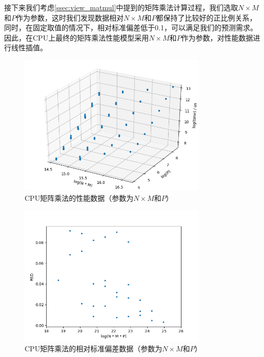     接下来我们考虑\ref{ssec:view_matmul}中提到的矩阵乘法计算过程，我们选取$ N \times M $和$ P $作为参数，这时我们发现数据相对$ N \times M $和$ P $都保持了比较好的正比例关系，同时，在固定取值的情况下，相对标准偏差低于0.1，可以满足我们的预测需求。因此，在CPU上最终的矩阵乘法性能模型采用$ N \times M $和$ P $作为参数，对性能数据进行线性插值。
    
    \begin{figure}[!htbp]
        \centering
        \includegraphics[width=0.8\textwidth]{figures/matmul_cpu_nm_p.png}
        \caption{CPU矩阵乘法的性能数据（参数为$N \times M $和$ P $）}
        \label{fig:matmul_cpu_nm_p}
    \end{figure}

    \begin{figure}[!htbp]
        \centering
        \includegraphics[width=0.8\textwidth]{figures/matmul_cpu_nm_p_rsd.png}
        \caption{CPU矩阵乘法的相对标准偏差数据（参数为$ N \times M $和$ P $）}
        \label{fig:matmul_cpu_nm_p_rsd}
    \end{figure}

